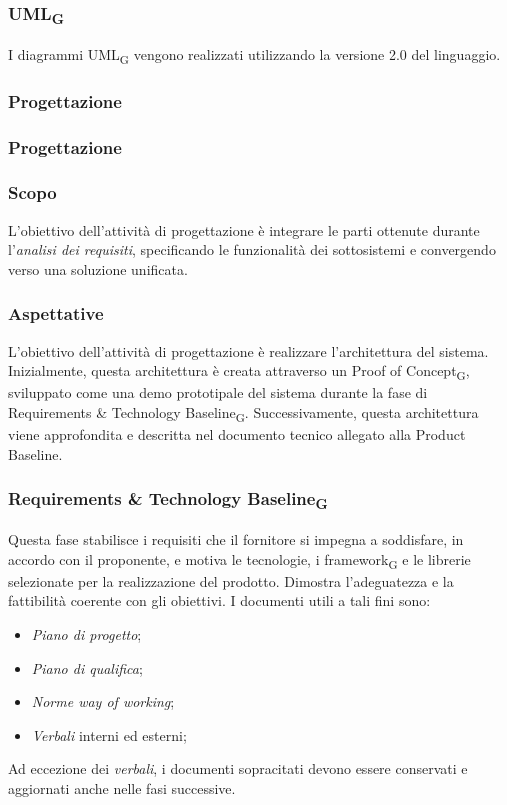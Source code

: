 \documentclass{article}
\begin{document}
\subsubsection*{UML\textsubscript{G}}
I diagrammi UML\textsubscript{G} vengono realizzati utilizzando la versione 2.0 del linguaggio.
\subsubsection{Progettazione}
\subsubsection*{Progettazione}
\subsubsection*{Scopo}
L'obiettivo dell'attività di progettazione è integrare le parti ottenute durante l'\textit{analisi dei requisiti}, specificando le funzionalità dei sottosistemi e convergendo verso una soluzione unificata.
\subsubsection*{Aspettative}
L'obiettivo dell'attività di progettazione è realizzare l'architettura del sistema. Inizialmente, questa architettura è creata attraverso un Proof of Concept\textsubscript{G}, sviluppato come una demo prototipale del sistema durante la fase di Requirements \& Technology Baseline\textsubscript{G}. Successivamente, questa architettura viene approfondita e descritta nel documento tecnico allegato alla Product Baseline.
\subsubsection*{Requirements \& Technology Baseline\textsubscript{G}}
Questa fase stabilisce i requisiti che il fornitore si impegna a soddisfare, in accordo con il proponente, e motiva le tecnologie, i framework\textsubscript{G} e le librerie selezionate per la realizzazione del prodotto. Dimostra l'adeguatezza e la fattibilità coerente con gli obiettivi. I documenti utili a tali fini sono:
\begin{itemize}
    \item \textit{Piano di progetto};
    \item \textit{Piano di qualifica};
    \item \textit{Norme way of working};
    \item \textit{Verbali} interni ed esterni;
\end{itemize}
Ad eccezione dei \textit{verbali}, i documenti sopracitati devono essere conservati e aggiornati anche nelle fasi successive.
\end{document}
